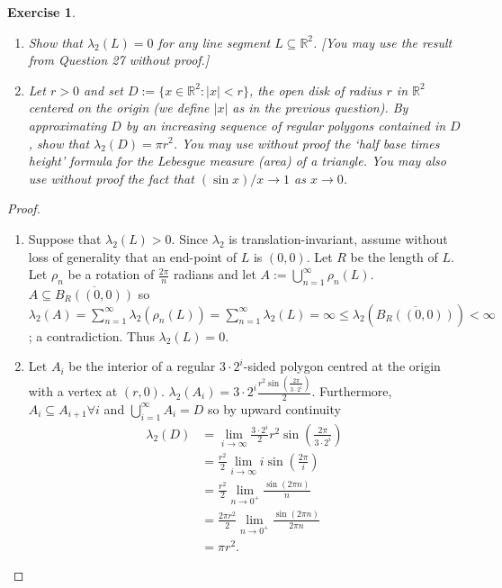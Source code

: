 \documentclass{article}
\newtheorem{exercise}[theorem]{Exercise}
\begin{document}
\begin{exercise} 
    \begin{enumerate}
        \item[(a)] Show that $\lambda_2(L) = 0$ for any line segment $L \subseteq \mathbb{R}^2$. \textit{[You may use the result from Question 27 without proof.]} 
        \item[(b)] Let $r > 0$ and set $D := \{x \in \mathbb{R}^2 : |x| < r\}$, the open disk of radius $r$ in $\mathbb{R}^2$ centered on the origin (we define $|x|$ as in the previous question). By approximating $D$ by an increasing sequence of regular polygons contained in $D$, show that $\lambda_2(D) = \pi r^2$. 
        \textit{You may use without proof the ‘half base times height’ formula for the Lebesgue measure (area) of a triangle. You may also use without proof the fact that $(\sin x)/x \to 1$ as $x \to 0$.}
    \end{enumerate}
\end{exercise}
\begin{proof}
\begin{enumerate}
    \item[(a)] Suppose that $\lambda_2(L)>0$. Since $\lambda_2$ is translation-invariant, assume without loss of generality that an end-point of $L$ is $(0,0)$. Let $R$ be the length of $L$. Let $\rho_n$ be a rotation of $\frac{2\pi}{n}$ radians and let $A:=\bigcup_{n=1}^\infty\rho_n(L)$. $A\subseteq \overline{B_R((0,0))}$ so $\lambda_2(A)=\sum_{n=1}^\infty\lambda_2(\rho_n(L))=\sum_{n=1}^\infty\lambda_2(L)=\infty\leq\lambda_2(\overline{B_R((0,0))})<\infty$; a contradiction. Thus $\lambda_2(L)=0$.
    \item[(b)] Let $A_i$ be the interior of a regular $3\cdot2^i$-sided polygon centred at the origin with a vertex at $(r,0)$. $\lambda_2(A_i)=3\cdot2^i\frac{r^2\sin(\frac{2\pi}{3\cdot2^i})}{2}$. Furthermore, $A_i\subseteq A_{i+1}\forall i$ and $\bigcup_{i=1}^\infty A_i=D$ so by upward continuity \begin{align*}\lambda_2(D)&=\lim_{i\to\infty}\frac{3\cdot2^i}{2}r^2\sin(\frac{2\pi}{3\cdot2^i})\\&=\frac{r^2}{2}\lim_{i\to\infty}i\sin(\frac{2\pi}{i})\\&=\frac{r^2}{2}\lim_{n\to0^+}\frac{\sin(2\pi n)}{n}\\&=\frac{2\pi r^2}{2}\lim_{n\to0^+}\frac{\sin(2\pi n)}{2\pi n}\\&=\pi r^2.\end{align*}
\end{enumerate}
\end{proof}
\end{document}
